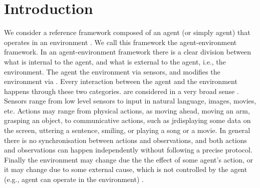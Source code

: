 \section{Introduction}





We consider a reference framework composed of an  agent (or simply agent) that operates in an
environment . We call this framework the agent-environment framework. In an
agent-environment framework there is a clear division between what is
internal to the agent, and what is external to the agent, i.e., the
environment. The agent  the environment via sensors, and  
modifies the environment via . Every interaction between the agent
and the environment happens through these two categories. 
are considered in a very broad sense . Sensors range from low level
sensors to input in natural language, images, movies, etc.  Actions
may range from physical actions, as moving ahead, moving an arm,
grasping an object, to communicative actions, such as jr{displaying} some data
on the screen, uttering a sentence, smiling, or playing a song or a
movie. In general
there is no synchronisation between actions and observations, and both
actions and observations can happen independently without following a
precise protocol.  Finally the environment may change due the the effect
of some agent's action, or it may change due to some external cause,
which is not controlled by the agent (e.g.,  agent can
operate in the environment) .

